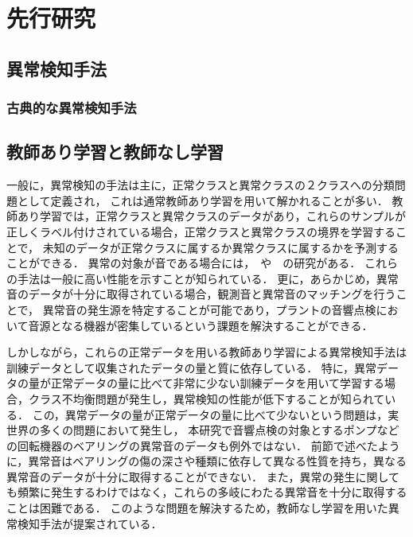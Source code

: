 \documentclass[../main]{subfiles}
\begin{document}
\section{先行研究}
\label{sec:intro_previous-research}
\subsection{異常検知手法}
\label{sec:intro_anomaly-detection}

\subsubsection{古典的な異常検知手法}

\subsection{}
\subsection{教師あり学習と教師なし学習}
一般に，異常検知の手法は主に，正常クラスと異常クラスの２クラスへの分類問題として定義され，
これは通常教師あり学習を用いて解かれることが多い．
教師あり学習では，正常クラスと異常クラスのデータがあり，これらのサンプルが正しくラベル付けされている場合，正常クラスと異常クラスの境界を学習することで，
未知のデータが正常クラスに属するか異常クラスに属するかを予測することができる．
異常の対象が音である場合には，　や　の研究がある．
これらの手法は一般に高い性能を示すことが知られている．
更に，あらかじめ，異常音のデータが十分に取得されている場合，観測音と異常音のマッチングを行うことで，
異常音の発生源を特定することが可能であり，プラントの音響点検において音源となる機器が密集しているという課題を解決することができる．

しかしながら，これらの正常データを用いる教師あり学習による異常検知手法は訓練データとして収集されたデータの量と質に依存している．
特に，異常データの量が正常データの量に比べて非常に少ない訓練データを用いて学習する場合，クラス不均衡問題が発生し，異常検知の性能が低下することが知られている．
この，異常データの量が正常データの量に比べて少ないという問題は，実世界の多くの問題において発生し，
本研究で音響点検の対象とするポンプなどの回転機器のベアリングの異常音のデータも例外ではない．
前節で述べたように，異常音はベアリングの傷の深さや種類に依存して異なる性質を持ち，異なる異常音のデータが十分に取得することができない．
また，異常の発生に関しても頻繁に発生するわけではなく，これらの多岐にわたる異常音を十分に取得することは困難である．
このような問題を解決するため，教師なし学習を用いた異常検知手法が提案されている．
\end{document}
